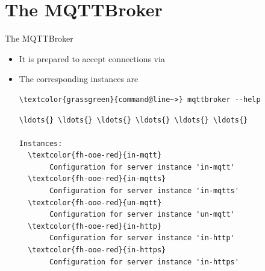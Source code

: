 ﻿\section[nosectionpage]{The MQTTBroker}

\begin{frame}[fragile]{The MQTTBroker}
\begin{itemize}
\item It is prepared to accept connections via
\item The corresponding instances are
\begin{scriptsize}
\begin{Verbatim}[commandchars=\\\{\}]
\textcolor{grassgreen}{command@line~>} mqttbroker --help
\end{Verbatim}
\begin{Verbatim}[commandchars=\\\{\},frame=leftline,rulecolor=\color{fh-ooe-red}]
\ldots{} \ldots{} \ldots{} \ldots{} \ldots{} \ldots{}

Instances:
  \textcolor{fh-ooe-red}{in-mqtt}
       Configuration for server instance 'in-mqtt'
  \textcolor{fh-ooe-red}{in-mqtts}
       Configuration for server instance 'in-mqtts'
  \textcolor{fh-ooe-red}{un-mqtt}
       Configuration for server instance 'un-mqtt'
  \textcolor{fh-ooe-red}{in-http}
       Configuration for server instance 'in-http'
  \textcolor{fh-ooe-red}{in-https}
       Configuration for server instance 'in-https'
\end{Verbatim}
\end{scriptsize}
\end{itemize}
\end{frame}
